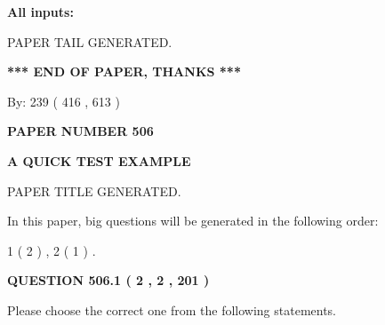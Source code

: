 \documentclass[12pt]{article}
\begin{document}
   
   
   
\noindent{}
   
   
   
   
\noindent\vspace{0.1in}\hspace{-0.08in} {\textbf{\Large{All inputs: }}}
   
   
   
   
   
   
 \vspace{0.2in}
 
   
   
\vspace{2.0in} PAPER TAIL GENERATED.
   
   
   
   
\vspace{1.0in} 
{\textbf{\large{ *** END OF PAPER, THANKS *** }}} 
   
   
\hspace{1.0in} By: 
 239 ( 416 ,  613 )
   
   
   
   
\newpage 
\setcounter{page}{ 
   506001 } 
   
   
   
   
 {\textbf{ \Large{ PAPER NUMBER  506  }}}
   
   
\vspace{0.2in}
   
   
   
   
   
   
   
   
 \vspace{0.2in}
{\LARGE {\textbf{ A QUICK TEST EXAMPLE}}}
   
   
 PAPER TITLE GENERATED.
   
   
   
\vspace{0.2in}
   
In this paper, big questions will be generated in the following order: 
   
   
   1 ( 2 )
 ,
   2 ( 1 )
 .
  
\vspace{0.2in}
  
{\textbf{\Large{QUESTION
506.1 
 ( 2 , 2 , 201 )
}}}
  
  
Please choose the correct one from the following statements.
 
\end{document}

